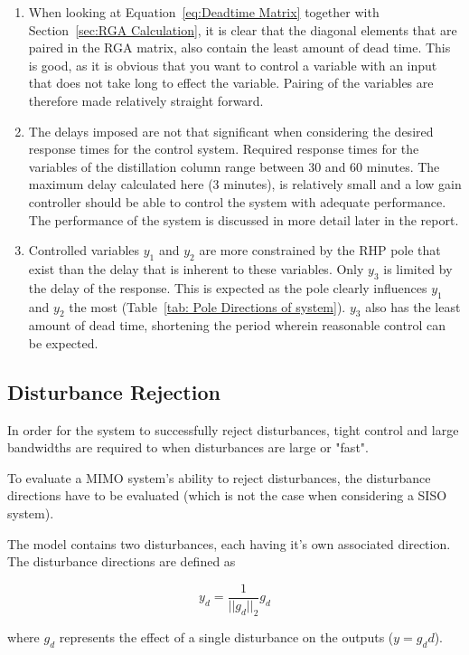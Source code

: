 \begin{enumerate}
	\item When looking at Equation~\ref{eq:Deadtime Matrix} together with Section~\ref{sec:RGA Calculation}, it is clear that the diagonal elements that are paired in the RGA matrix, also contain the least amount of dead time. This is good, as it is obvious that you want to control a variable with an input that does not take long to effect the variable. Pairing of the variables are therefore made relatively straight forward.
	\item The delays imposed are not that significant when considering the desired response times for the control system. Required response times for the variables of the distillation column range between 30 and 60 minutes. The maximum delay calculated here (3 minutes), is relatively small and a low gain controller should be able to control the system with adequate performance. The performance of the system is discussed in more detail later in the report.
	\item Controlled variables $y_1$ and $y_2$ are more constrained by the RHP pole that exist than the delay that is inherent to these variables. Only $y_3$ is limited by the delay of the response. This is expected as the pole clearly influences $y_1$ and $y_2$ the most (Table~\ref{tab: Pole Directions of system}). $y_3$ also has the least amount of dead time, shortening the period wherein reasonable control can be expected.
\end{enumerate}

\subsection{Disturbance Rejection}

In order for the system to successfully reject disturbances, tight control and large bandwidths are required to when disturbances are large or "fast". 

To evaluate a MIMO system's ability to reject disturbances, the disturbance directions have to be evaluated (which is not the case when considering a SISO system). 

The model contains two disturbances, each having it's own associated direction. The disturbance directions are defined as

\begin{equation}
	y_d = \frac{1}{||g_d||_2}g_d
\end{equation}

where $g_d$ represents the effect of a single disturbance on the outputs ($y = g_dd$).

